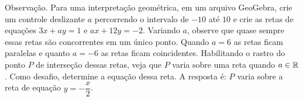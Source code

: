\begin{solution}
\medskip
Observação. Para uma interpretação geométrica, em um arquivo GeoGebra, crie um controle deslizante $a$
percorrendo o intervalo de $-10$ até $10$  e crie as retas de equações $3x+ay=1$ e $ax+12y=-2$. Variando $a$, observe que quase sempre essas retas são concorrentes em um único ponto. Quando $a=6$ as retas ficam paralelas e quanto $a=-6$ as retas ficam coincidentes. Habilitando o rastro do ponto $P$ de interseção dessas retas, veja que $P$ varia sobre uma reta quando $a\in\mathbb{R}$.
Como desafio, determine a equação dessa reta. A resposta é: $P$ varia sobre a reta de equação $y=-\dfrac{x}{2}$.
\end{solution}


